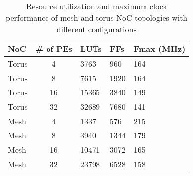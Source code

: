 \begin{table}[!t]
  \centering
  \caption{Resource utilization and maximum clock performance of mesh and torus NoC topologies with different configurations} 
  \begin{tabular}{l|c|l|l|l}
      \toprule
      NoC & \# of PEs & LUTs & FFs & Fmax (MHz) \\
	  \midrule
	  Torus  & 4  & 3763 & 960   & 164\\
	  Torus  & 8  & 7615 & 1920  & 164\\
	  Torus  & 16  & 15365 & 3840 & 149\\
	  Torus  & 32  & 32689 & 7680 & 141\\
	  \midrule
	  Mesh  & 4  & 1337 & 576   & 215\\
	  Mesh  & 8  & 3940 & 1344  & 179\\
	  Mesh  & 16  & 10471 & 3072 & 165\\
	  Mesh  & 32  & 23798 & 6528 & 158\\
      \bottomrule
    \end{tabular}
	\label{table:NocResourceUtilisation}
\end{table}